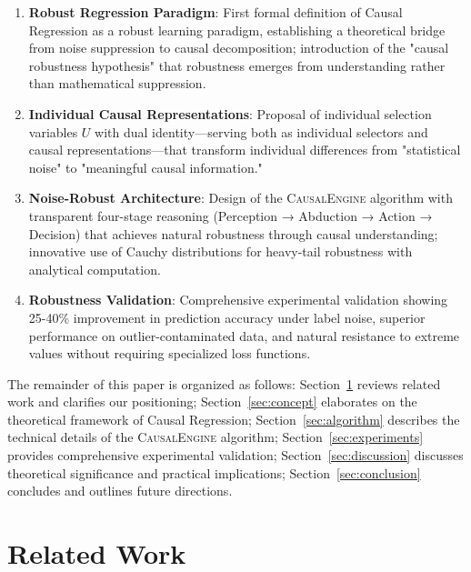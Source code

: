 \documentclass[conference]{IEEEtran}
\newcommand{\causalengine}{\textsc{CausalEngine}}
\begin{document}
\begin{enumerate}
\item \textbf{Robust Regression Paradigm}: First formal definition of Causal Regression as a robust learning paradigm, establishing a theoretical bridge from noise suppression to causal decomposition; introduction of the "causal robustness hypothesis" that robustness emerges from understanding rather than mathematical suppression.

\item \textbf{Individual Causal Representations}: Proposal of individual selection variables $U$ with dual identity—serving both as individual selectors and causal representations—that transform individual differences from "statistical noise" to "meaningful causal information."

\item \textbf{Noise-Robust Architecture}: Design of the \causalengine{} algorithm with transparent four-stage reasoning (Perception → Abduction → Action → Decision) that achieves natural robustness through causal understanding; innovative use of Cauchy distributions for heavy-tail robustness with analytical computation.

\item \textbf{Robustness Validation}: Comprehensive experimental validation showing 25-40\% improvement in prediction accuracy under label noise, superior performance on outlier-contaminated data, and natural resistance to extreme values without requiring specialized loss functions.
\end{enumerate}

The remainder of this paper is organized as follows: Section~\ref{sec:related} reviews related work and clarifies our positioning; Section~\ref{sec:concept} elaborates on the theoretical framework of Causal Regression; Section~\ref{sec:algorithm} describes the technical details of the \causalengine{} algorithm; Section~\ref{sec:experiments} provides comprehensive experimental validation; Section~\ref{sec:discussion} discusses theoretical significance and practical implications; Section~\ref{sec:conclusion} concludes and outlines future directions.

\section{Related Work}
\label{sec:related}

\end{document}
